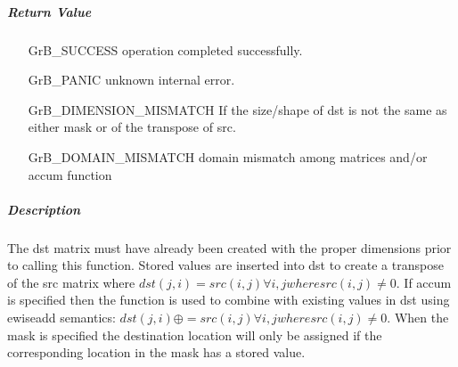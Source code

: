 \subparagraph{Return Value}


\begin{itemize}[leftmargin=2.1in]
\item[{\sf GrB\_SUCCESS}] 	operation completed successfully.
\item[{\sf GrB\_PANIC}]	    unknown internal error.
\item[{\sf GrB\_DIMENSION\_MISMATCH}]	  
        If the size/shape of dst is not the same as either mask or
        of the transpose of src.
\item[{\sf GrB\_DOMAIN\_MISMATCH}]  
	    domain mismatch among matrices and/or
        accum function 
\end{itemize}

\subparagraph{Description}

The dst matrix must have already been created with the proper dimensions
prior to calling this function.  Stored values are inserted into dst to
create a transpose of the src matrix where 
$dst(j,i) = src(i,j) \forall i,j where src(i,j) \neq 0$.
If accum is specified then the function is used to combine with existing values in dst using ewiseadd semantics:
$dst(j,i) \oplus = src(i,j) \forall i,j where src(i,j) \neq 0$.
When the mask is specified the destination location will only be assigned if the corresponding location in the mask has a stored value.





